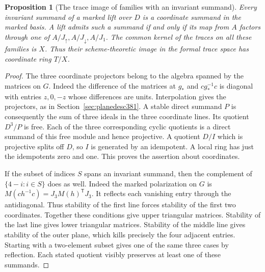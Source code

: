 \documentclass[a4paper,11pt]{article}
\newtheorem{proposition}{Proposition}[section]
\theoremstyle{definition}
\theoremstyle{remark}
\numberwithin{equation}{section}
\begin{document}
\begin{proposition}[The trace image of families with an invariant summand]
\label{prop:flagimage385}
Every invariant summand of a marked lift over \(D\) is a coordinate
summand in the marked basis. A lift admits such a summand if and
only if its map from \(A\) factors through one of
\(A/J_\uparrow,A/J_\downarrow,A/J_1\).
The common kernel of the traces on all these families is \(X\).
Thus their scheme-theoretic image in the formal trace space has
coordinate ring \(T/X\).
\end{proposition}
\begin{proof}
The three coordinate projectors belong to the algebra spanned
by the matrices on \(G\). Indeed the difference of the matrices
at \(g_*\) and \(cg_*^{-1}c\) is diagonal with entries \(z,0,-z\)
whose differences are units. Interpolation gives the projectors,
as in Section~\ref{sec:planedesc381}. A stable direct summand
\(P\) is consequently the sum of three ideals in the three
coordinate lines. Its quotient \(D^3/P\) is free. Each of the
three corresponding cyclic quotients is a direct summand of
this free module and hence projective. A quotient \(D/I\)
which is projective splits off \(D\), so \(I\) is generated by
an idempotent. A local ring has just the idempotents zero and
one. This proves the assertion about coordinates.

If the subset of indices \(S\) spans an invariant summand,
then the complement of \(\{4-i:i\in S\}\) does as well.
Indeed the marked polarization on \(G\) is
\(M(ch^{-1}c)=J_3M(h)^{\mathsf T}J_3\). It reflects each
vanishing entry through the antidiagonal. Thus stability of
the first line forces stability of the first two coordinates.
Together these conditions give upper triangular matrices.
Stability of the last line gives lower triangular matrices.
Stability of the middle line gives stability of the outer
plane, which kills precisely the four adjacent entries.
Starting with a two-element subset gives one of the same
three cases by reflection. Each stated quotient visibly
preserves at least one of these summands.


\end{proof}
\end{document}
